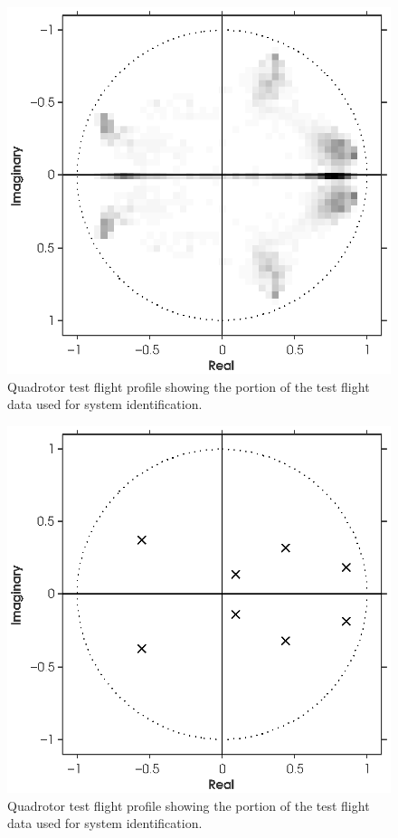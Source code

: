 \begin{figure}[htb!]
	\centering
	\includegraphics{../fig/poles_parsim_all.eps}
	\caption{Quadrotor test flight profile showing the portion of the test flight data used for system identification.}
\end{figure}

\begin{figure}[htb!]
	\centering
	\includegraphics{../fig/poles_parsim.eps}
	\caption{Quadrotor test flight profile showing the portion of the test flight data used for system identification.}
\end{figure}


